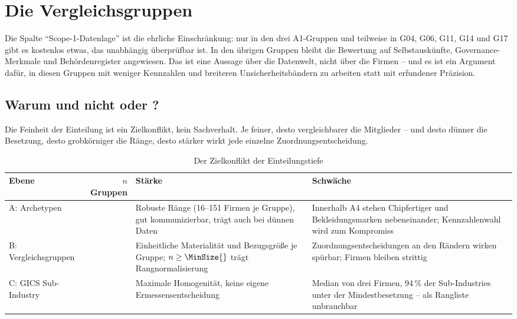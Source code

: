 \documentclass[11pt,a4paper]{article}
\begin{document}
\section{Die \NGroups{} Vergleichsgruppen}

\begin{table}[htbp]
\caption{Die Ranking-Ebene: \NGroups{} Gruppen, \NFirms{} Firmen, $n_{\min}=\MinGroup$, Median $\MedGroup$, $n_{\max}=\MaxGroup$}
\label{tab:groups}
\small

\end{table}

Die Spalte ``Scope-1-Datenlage'' ist die ehrliche Einschränkung: nur in den drei A1-Gruppen und teilweise in G04, G06, G11, G14 und G17 gibt es kostenlos etwas, das unabhängig überprüfbar ist. In den übrigen Gruppen bleibt die Bewertung auf Selbstauskünfte, Governance-Merkmale und Behördenregister angewiesen. Das ist eine Aussage über die Datenwelt, nicht über die Firmen -- und es ist ein Argument dafür, in diesen Gruppen mit weniger Kennzahlen und breiteren Unsicherheitsbändern zu arbeiten statt mit erfundener Präzision.

\subsection{Warum \NGroups{} und nicht \NArchetypes{} oder \NSubIndustries{}?}

Die Feinheit der Einteilung ist ein Zielkonflikt, kein Sachverhalt. Je feiner, desto vergleichbarer die Mitglieder -- und desto dünner die Besetzung, desto grobkörniger die Ränge, desto stärker wirkt jede einzelne Zuordnungsentscheidung.

\begin{table}[htbp]
\caption{Der Zielkonflikt der Einteilungstiefe}
\label{tab:tradeoff}
\small
\begin{tabularx}{\linewidth}{@{}l r X X@{}}
\toprule
Ebene & $n$ Gruppen & Stärke & Schwäche \\
\midrule
A: Archetypen & \NArchetypes{} & Robuste Ränge (16--151 Firmen je Gruppe), gut kommunizierbar, trägt auch bei dünnen Daten & Innerhalb A4 stehen Chipfertiger und Bekleidungsmarken nebeneinander; Kennzahlenwahl wird zum Kompromiss \\
B: Vergleichsgruppen & \NGroups{} & Einheitliche Materialität und Bezugsgröße je Gruppe; $n \geq \MinSize{}$ trägt Rangnormalisierung & Zuordnungsentscheidungen an den Rändern wirken spürbar; \NContested{} Firmen bleiben strittig \\
C: GICS Sub-Industry & \NSubIndustries{} & Maximale Homogenität, keine eigene Ermessensentscheidung & Median von drei Firmen, 94\,\% der Sub-Industries unter der Mindestbesetzung -- als Rangliste unbrauchbar \\
\bottomrule
\end{tabularx}
\end{table}
\end{document}
